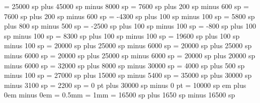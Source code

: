 \gre@interwordspacetext = 25000 sp plus 45000 sp minus 8000 sp
\gre@bitrivirspace = 7600 sp plus 200 sp minus 600 sp
\gre@bitristrospace = 7600 sp plus 200 sp minus 600 sp
\gre@punctuminclinatumshift= -4300 sp plus 100 sp minus 100 sp
\gre@beforepunctainclinatashift= 5800 sp plus 800 sp minus 500 sp
\gre@punctuminclinatumanddebilisshift= -2500 sp plus 100 sp minus 100 sp
\gre@punctuminclinatumdebilisshift= -800 sp plus 100 sp minus 100 sp
\gre@punctuminclinatumbigshift= 8300 sp plus 100 sp minus 100 sp
\gre@punctuminclinatummaxshift= 19600 sp plus 100 sp minus 100 sp
\gre@spacearoundsmallbar = 20000 sp plus 25000 sp minus 6000 sp
\gre@spacearoundminor = 20000 sp plus 25000 sp minus 6000 sp
\gre@spacearoundmaior = 20000 sp plus 25000 sp minus 6000 sp
\gre@spacearoundfinalis = 20000 sp plus 20000 sp minus 6000 sp
\gre@spacebeforefinalfinalis= 32000 sp plus 8000 sp minus 30000 sp
\gre@spacearoundclefbars= 4000 sp plus 500 sp minus 100 sp
\gre@textbartextspace = 27000 sp plus 15000 sp minus 5400 sp
\gre@notebarspace = 35000 sp plus 30000 sp minus 3100 sp
\gre@maximumspacewithoutdash = 2200 sp
\gre@afterclefnospace = 0 pt plus 30000 sp minus 0 pt
\gre@additionalcustoslineswidth = 10000 sp
 em plus 0em minus 0em
\gre@minimalspaceatlinebeginning=1mm
\gre@manualinitialwidth=0pt
\gre@aboveinitialseparation = 0.5mm
\gre@noclefspace = 1mm
\gre@clefchangespace = 16500 sp plus 1650 sp minus 16500 sp%



